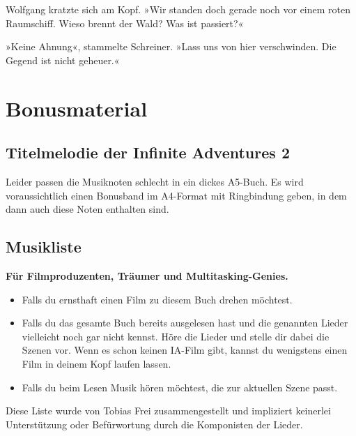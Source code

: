 Wolfgang kratzte sich am Kopf. »Wir standen doch gerade noch vor einem roten Raumschiff. Wieso brennt der Wald? Was ist passiert?«

»Keine Ahnung«, stammelte Schreiner. »Lass uns von hier verschwinden. Die Gegend ist nicht geheuer.«



\part{Bonusmaterial}

\chapter{Titelmelodie der Infinite Adventures 2}

Leider passen die Musiknoten schlecht in ein dickes A5-Buch. Es wird voraussichtlich einen Bonusband im A4-Format mit Ringbindung geben, in dem dann auch diese Noten enthalten sind.

%


\chapter{Musikliste}

\textbf{Für Filmproduzenten, Träumer und Multitasking-Genies.}

\begin{itemize}
    \item Falls du ernsthaft einen Film zu diesem Buch drehen möchtest.
    \item Falls du das gesamte Buch bereits ausgelesen hast und die genannten Lieder vielleicht noch gar nicht kennst. Höre die Lieder und stelle dir dabei die Szenen vor. Wenn es schon keinen IA-Film gibt, kannst du wenigstens einen Film in deinem Kopf laufen lassen.
    \item Falls du beim Lesen Musik hören möchtest, die zur aktuellen Szene passt.
\end{itemize}

Diese Liste wurde von Tobias Frei zusammengestellt und impliziert keinerlei Unterstützung oder Befürwortung durch die Komponisten der Lieder.

